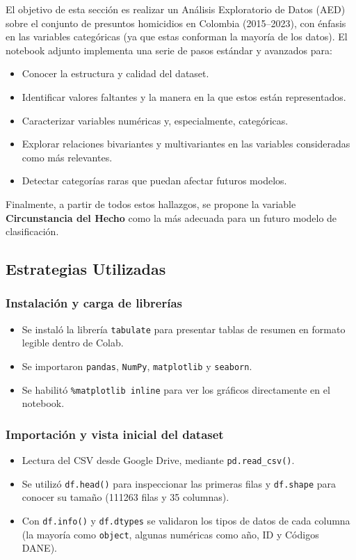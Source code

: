 \documentclass[lettersize,journal]{IEEEtran}
\begin{document}
El objetivo de esta sección es realizar un Análisis Exploratorio de Datos (AED) sobre el conjunto de presuntos homicidios en Colombia (2015–2023), con énfasis en las variables categóricas (ya que estas conforman la mayoría de los datos). El notebook adjunto implementa una serie de pasos estándar y avanzados para:

\begin{itemize}
    \item Conocer la estructura y calidad del dataset.
    \item Identificar valores faltantes y la manera en la que estos están representados.
    \item Caracterizar variables numéricas y, especialmente, categóricas.
    \item Explorar relaciones bivariantes y multivariantes en las variables consideradas como más relevantes.
    \item Detectar categorías raras que puedan afectar futuros modelos.
\end{itemize}

Finalmente, a partir de todos estos hallazgos, se propone la variable \textbf{Circunstancia del Hecho} como la más adecuada para un futuro modelo de clasificación.

\subsection{Estrategias Utilizadas}

\subsubsection{Instalación y carga de librerías}
\begin{itemize}
    \item Se instaló la librería \texttt{tabulate} para presentar tablas de resumen en formato legible dentro de Colab.
    \item Se importaron \texttt{pandas}, \texttt{NumPy}, \texttt{matplotlib} y \texttt{seaborn}.
    \item Se habilitó \texttt{\%matplotlib inline} para ver los gráficos directamente en el notebook.
\end{itemize}

\subsubsection{Importación y vista inicial del dataset}
\begin{itemize}
    \item Lectura del CSV desde Google Drive, mediante \texttt{pd.read\_csv()}.
    \item Se utilizó \texttt{df.head()} para inspeccionar las primeras filas y \texttt{df.shape} para conocer su tamaño (111263 filas y 35 columnas).
    \item Con \texttt{df.info()} y \texttt{df.dtypes} se validaron los tipos de datos de cada columna (la mayoría como \texttt{object}, algunas numéricas como año, ID y Códigos DANE).
\end{itemize}
\end{document}
